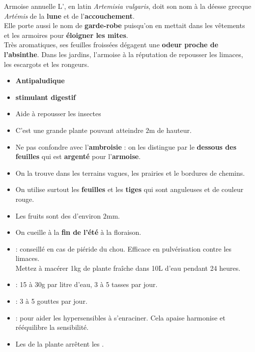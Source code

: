 \renewcommand{\cita}{
    \phantom{a}\citer{En tant que plante magique, elle servait pour les prophéties et la divinitation.\\On la fumait}{Les plantes des druides}
}
\ficheidentiteplante
{Armoise annuelle}
{%
    L', en latin \textit{Artemisia vulgaris}, doit son nom
    à la déesse grecque \textit{Artémis} de la \textbf{lune} et de l'\textbf{accouchement}.\\
    Elle porte aussi le nom de \textbf{garde-robe} puisqu'on en mettait dans les vêtements et les armoires pour \textbf{éloigner les mites}.\\

    Très aromatiques, ses feuilles froissées dégagent une \textbf{odeur proche de l'absinthe}.
    Dans les jardins, l'armoise à la réputation de repousser les limaces, les escargots et les rongeurs.
}
{%
    \begin{itemize}[label = \bcplume]
        \item \textbf{Antipaludique}
        \item \textbf{stimulant digestif}
        \item Aide à repousser les insectes
    \end{itemize}
}
{%
    \begin{itemize}[label = \bcplume]
        \item C'est une grande plante pouvant atteindre $2$m de hauteur.
        \item Ne pas confondre avec l'\textbf{ambroisie} : on les distingue par le \textbf{dessous des feuilles} qui est \textbf{argenté} pour l'\textbf{armoise}.
        \item On la trouve dans les terrains vagues, les prairies et le bordures de chemins.
        \item On utilise surtout les \textbf{feuilles} et les \textbf{tiges} qui sont anguleuses et de couleur rouge.
        \item Les fruits sont des  d'environ $2$mm.
        \item On cueille à la \textbf{fin de l'été} à la floraison.
    \end{itemize}
}
{%
    \begin{itemize}[label = \bccrayon]
        \item {} : conseillé en cas de piéride du chou. Efficace en pulvérisation contre les limaces.\\ Mettez à macérer 1kg de plante fraîche dans 10L d'eau pendant 24 heures.
        \item {} : 15 à 30g par litre d'eau, 3 à 5 tasses par jour.
        \item {} : 3 à 5 gouttes par jour.
        \item {} : pour aider les hypersensibles à s'enraciner. Cela apaise harmonise et rééquilibre la sensibilité.
        \item Les  de la plante arrêtent les .
    \end{itemize}
}

